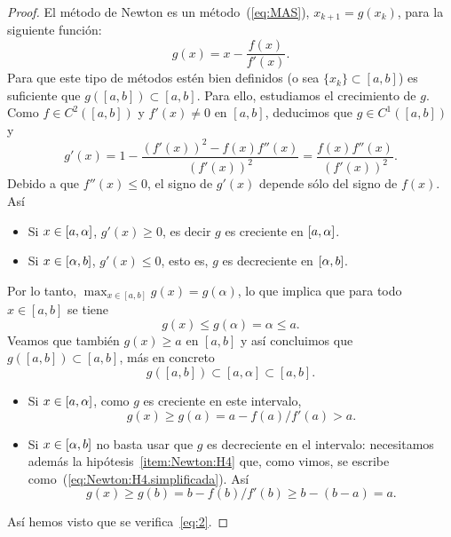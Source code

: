 \begin{proof}
  El método de Newton es un
  método~(\ref{eq:MAS}), $x_{k+1}=g(x_k)$, para la siguiente función:
  \begin{equation*}
    g(x)=x-\frac{f(x)}{f'(x)}.
  \end{equation*}
  Para que este tipo de métodos estén bien definidos (o sea
  $\{x_k\}\subset [a,b]$) es suficiente que $g([a,b])\subset [a,b]$.
  Para ello, estudiamos el crecimiento de $g$.
  Como $f\in C^2([a,b])$ y $f'(x)\neq 0$ en
  $[a,b]$, deducimos que $g\in C^1([a,b])$ y
  \begin{equation}
    g'(x)
    = 1-\frac{\left(f'(x)\right)^2-f(x)f''(x)}{\left(f'(x)\right)^2}
    = \frac{f(x)f''(x)}{\left(f'(x)\right)^2}.
    \label{eq:Newton.g'(x)}    
  \end{equation}
  Debido a que $f''(x)\le 0$, el signo de $g'(x)$ depende sólo del
  signo de $f(x)$. Así
  \begin{itemize}%
  \item Si $x\in [a,\alpha]$, $g'(x)\ge 0$, es decir $g$ es creciente en
    $[a,\alpha]$.
  \item Si $x\in [\alpha,b]$, $g'(x)\le 0$, esto es, $g$ es decreciente
    en $[\alpha,b]$.
  \end{itemize}

  Por lo tanto, $\max_{x\in [a,b]} g(x)=g(\alpha)$, lo que implica que
  para todo
  $x\in [a,b]$ se tiene 
  $$
  g(x)\le g(\alpha)=\alpha \le a.
  $$
  Veamos que también $g(x)\ge a$ en $[a,b]$ y así concluimos que
  $g([a,b]) \subset [a,b]$, más en concreto 
  \begin{equation}
    g([a,b])\subset [a,\alpha] \subset [a,b].\label{eq:2}    
  \end{equation}

  \begin{itemize}
  \item Si $x\in [a,\alpha]$, como $g$ es creciente en este intervalo,
    $$g(x)\ge  g(a) = a-f(a)/f'(a) > a.$$
  \item Si $x\in [\alpha,b]$ no basta usar que $g$ es
    decreciente en el intervalo: necesitamos además la
    hipótesis~\ref{item:Newton:H4} que, como vimos, se escribe
    como~(\ref{eq:Newton:H4.simplificada}). Así
    $$g(x) \ge g(b)=b-f(b)/f'(b) \ge b-(b-a)=a.$$
  \end{itemize}
  Así hemos visto que se verifica~\eqref{eq:2}.


\end{proof}
